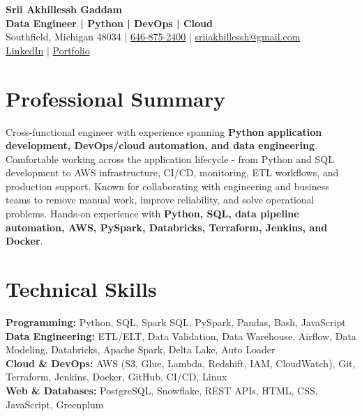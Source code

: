 \documentclass[letterpaper,10pt]{article}
\begin{document}
\fontsize{9.35pt}{10.45pt}\selectfont

\begin{center}
    {\LARGE \textbf{Srii Akhillessh Gaddam}} \\[-1pt]
    \textbf{Data Engineer | Python | DevOps | Cloud} \\[2pt]
    Southfield, Michigan 48034 $|$
    \href{tel:6468752400}{646-875-2400} $|$
    \href{mailto:sriiakhillessh@gmail.com}{sriiakhillessh@gmail.com} \\[1pt]
    \href{https://www.linkedin.com/in/srii-akhiilessh-gaddam-b48668191/}{LinkedIn} $|$
    \href{https://sriiakhillesshg.github.io/portfolio/}{Portfolio}
\end{center}
\vspace{-8pt}

\section{Professional Summary}
\small{Cross-functional engineer with experience spanning \textbf{Python application development, DevOps/cloud automation, and data engineering}. Comfortable working across the application lifecycle - from Python and SQL development to AWS infrastructure, CI/CD, monitoring, ETL workflows, and production support. Known for collaborating with engineering and business teams to remove manual work, improve reliability, and solve operational problems. Hands-on experience with \textbf{Python, SQL, data pipeline automation, AWS, PySpark, Databricks, Terraform, Jenkins, and Docker}.}

\section{Technical Skills}
\small{
\textbf{Programming:} Python, SQL, Spark SQL, PySpark, Pandas, Bash, JavaScript \\
\textbf{Data Engineering:} ETL/ELT, Data Validation, Data Warehouse, Airflow, Data Modeling, Databricks, Apache Spark, Delta Lake, Auto Loader \\
\textbf{Cloud \& DevOps:} AWS (S3, Glue, Lambda, Redshift, IAM, CloudWatch), Git, Terraform, Jenkins, Docker, GitHub, CI/CD, Linux \\
\textbf{Web \& Databases:} PostgreSQL, Snowflake, REST APIs, HTML, CSS, JavaScript, Greenplum
}
\end{document}
